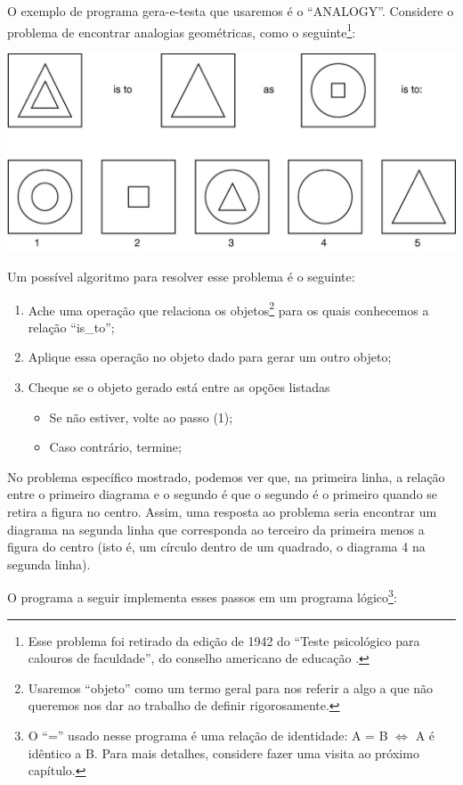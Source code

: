 \documentclass{article}
\theoremstyle{remark}
\theoremstyle{theorem}
\begin{document}
O exemplo de programa gera-e-testa que usaremos é o ``ANALOGY''. Considere o problema de encontrar analogias geométricas, como o seguinte\footnote{Esse problema foi retirado da edição de 1942 do ``Teste psicológico para calouros de faculdade'', do conselho americano de educação \cite{evans}.}:\vspace{1cm}

\includegraphics[width=\linewidth]{analogy}

\vspace{1cm}Um possível algoritmo para resolver esse problema é o seguinte:

\begin{enumerate}
  \item Ache uma operação que relaciona os objetos\footnote{Usaremos ``objeto'' como um termo geral para nos referir a algo a que não queremos nos dar ao trabalho de definir rigorosamente.} para os quais conhecemos a relação ``is\_to'';
  \item Aplique essa operação no objeto dado para gerar um outro objeto;
  \item Cheque se o objeto gerado está entre as opções listadas
    \begin{itemize}
      \item Se não estiver, volte ao passo (1);
      \item Caso contrário, termine;
    \end{itemize}
\end{enumerate}

No problema específico mostrado, podemos ver que, na primeira linha, a relação entre o primeiro diagrama e o segundo é que o segundo é o primeiro quando se retira a figura no centro. Assim, uma resposta ao problema seria encontrar um diagrama na segunda linha que corresponda ao terceiro da primeira menos a figura do centro (isto é, um círculo dentro de um quadrado, o diagrama 4 na segunda linha).

O programa a seguir implementa esses passos em um programa lógico\footnote{O ``='' usado nesse programa é uma relação de identidade: A = B $\Leftrightarrow$ A é idêntico a B. Para mais detalhes, considere fazer uma visita ao próximo capítulo.}:
\end{document}
